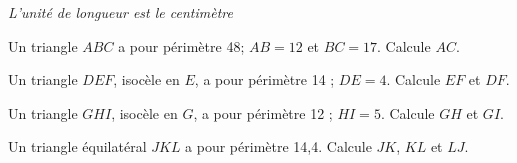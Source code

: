 {\em L'unité de longueur est le centimètre}
\begin{myenumerate}
  \item Un triangle $ABC$ a pour périmètre 48; $AB=12$ et
    $BC=17$. Calcule $AC$.
  \item Un triangle $DEF$, isocèle en $E$, a pour périmètre 14 ;
    $DE=4$. Calcule $EF$ et $DF$.
  \item Un triangle $GHI$, isocèle en $G$, a pour périmètre 12 ;
    $HI=5$. Calcule $GH$ et $GI$.
  \item Un triangle équilatéral $JKL$ a pour périmètre 14,4. Calcule
    $JK$, $KL$ et $LJ$.
\end{myenumerate}
